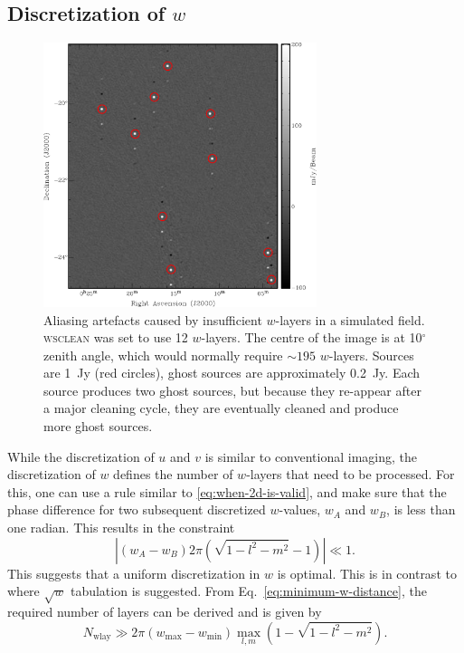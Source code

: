 \documentclass[useAMS,usenatbib]{mn2e}
\newcommand{\degree}{\ensuremath{^{\circ}}\xspace}
\begin{document}
\subsection{Discretization of $w$} \label{sec:gridding-w}
\begin{figure}
\begin{center}
\includegraphics[width=8cm]{img/aliasing-example-annotated}
\caption{Aliasing artefacts caused by insufficient $w$-layers in a simulated field. \textsc{wsclean} was set to use 12 $w$-layers. The centre of the image is at 10\degree zenith angle, which would normally require $\sim195$ $w$-layers. Sources are 1~Jy (red circles), ghost sources are approximately 0.2~Jy. Each source produces two ghost sources, but because they re-appear after a major cleaning cycle, they are eventually cleaned and produce more ghost sources. }
\label{fig:aliasing-example}
\end{center}
\end{figure}
While the discretization of $u$ and $v$ is similar to conventional imaging, the discretization of $w$ defines the number of $w$-layers that need to be processed. For this, one can use a rule similar to \eqref{eq:when-2d-is-valid}, and make sure that the phase difference for two subsequent discretized $w$-values, $w_A$ and $w_B$,  is less than one radian. This results in the constraint
\begin{equation} \label{eq:minimum-w-distance}
\left|\left(w_A - w_B\right) 2\pi (\sqrt{1-l^2-m^2}-1)\right| \ll 1.
\end{equation}
This suggests that a uniform discretization in $w$ is optimal. This is in contrast to \citet{wprojection-cornwell} where $\sqrt{w}$ tabulation is suggested. From Eq.~\eqref{eq:minimum-w-distance}, the required number of layers can be derived and is given by
\begin{equation} \label{eq:nwlayers-bound}
 N_\textrm{wlay} \gg 2\pi \left(w_{\max} - w_{\min}\right) \max_{l,m} \left(1 - \sqrt{1-l^2-m^2}\right).
\end{equation}
\end{document}
